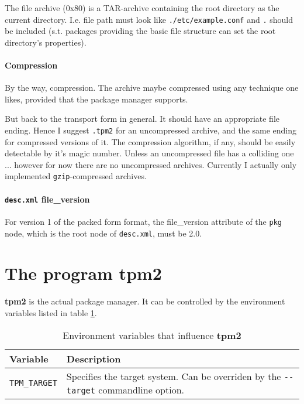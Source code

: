 \documentclass[a4paper]{scrartcl}
\newcommand{\file}[1]{\texttt{#1}}
\newcommand{\program}[1]{\textbf{#1}}
\begin{document}
	The file archive (0x80) is a TAR-archive containing the root directory as the current directory. I.e. file path must look like \texttt{./etc/example.conf} and \texttt{.} should be included (s.t. packages providing the basic file structure can set the root directory's properties).
	
	
	\paragraph{Compression}
	
	By the way, compression. The archive maybe compressed using any technique one likes, provided that the package manager supports.
	
	\vspace{1eM}
	But back to the transport form in general. It should have an appropriate file ending. Hence I suggest \file{.tpm2} for an uncompressed archive, and the same ending for compressed versions of it. The compression algorithm, if any, should be easily detectable by it's magic number. Unless an uncompressed file has a colliding one ... however for now there are no uncompressed archives. Currently I actually only implemented \texttt{gzip}-compressed archives.
	
	\paragraph{\file{desc.xml} file\_version} For version 1 of the packed form format, the file\_version attribute of the \texttt{pkg} node, which is the root node of \file{desc.xml}, must be 2.0.
	
	
	\section{The program \program{tpm2}}
	\label{sec:the_program_tpm2}
	
	\program{tpm2} is the actual package manager. It can be controlled by the environment variables listed in table \ref{tab:environment_variables_for_tpm2}.
	
	\begin{table}[ht]
		\centering
		
		\begin{tabularx}{.9\textwidth}{l|X}
			Variable & Description \\
			\hline
			\texttt{TPM\_TARGET} & Specifies the target system. Can be overriden by the \texttt{-{}-target} commandline option. \\
		\end{tabularx}
	
		\caption{Environment variables that influence \program{tpm2}}
		\label{tab:environment_variables_for_tpm2}
	\end{table}
\end{document}
